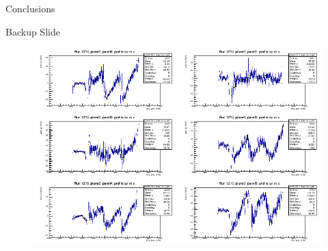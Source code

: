 \documentclass{beamer}[10pt]
\begin{document}
\begin{frame}{Conclusions}
 
\end{frame}
\begin{frame}{Backup Slide}
  
      \begin{figure}[H]
        \centering
        \includegraphics[width= \textwidth]{figures/pdf/plane0_prof_bias.png}
        \label{fig:enter-label}
    \end{figure}
  \end{frame}
\end{document}
